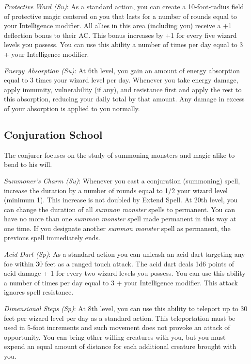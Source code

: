 \textit{Protective Ward (Su)}: As a standard action, you can create a 10-foot-radius field of protective magic centered on you that lasts for a number of rounds equal to your Intelligence modifier. All allies in this area (including you) receive a +1 deflection bonus to their AC. This bonus increases by +1 for every five wizard levels you possess. You can use this ability a number of times per day equal to 3 + your Intelligence modifier.
				
\textit{Energy Absorption (Su)}: At 6th level, you gain an amount of energy absorption equal to 3 times your wizard level per day. Whenever you take energy damage, apply immunity, vulnerability (if any), and resistance first and apply the rest to this absorption, reducing your daily total by that amount. Any damage in excess of your absorption is applied to you normally.
				
\subsection{Conjuration School}

				
The conjurer focuses on the study of summoning monsters and magic alike to bend to his will.
				
\textit{Summoner's Charm (Su)}: Whenever you cast a conjuration (summoning) spell, increase the duration by a number of rounds equal to 1/2 your wizard level (minimum 1). This increase is not doubled by Extend Spell. At 20th level, you can change the duration of all \textit{summon monster} spells to permanent. You can have no more than one \textit{summon monster} spell made permanent in this way at one time. If you designate another \textit{summon monster }spell as permanent, the previous spell immediately ends.
				
\textit{Acid Dart (Sp)}: As a standard action you can unleash an acid dart targeting any foe within 30 feet as a ranged touch attack. The acid dart deals 1d6 points of acid damage + 1 for every two wizard levels you possess. You can use this ability a number of times per day equal to 3 + your Intelligence modifier. This attack ignores spell resistance.
				
\textit{Dimensional Steps (Sp)}: At 8th level, you can use this ability to teleport up to 30 feet per wizard level per day as a standard action. This teleportation must be used in 5-foot increments and such movement does not provoke an attack of opportunity. You can bring other willing creatures with you, but you must expend an equal amount of distance for each additional creature brought with you.
				
